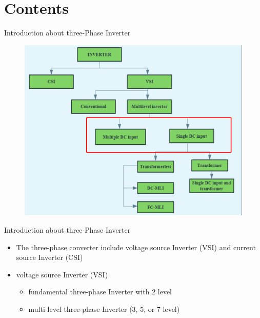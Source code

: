\documentclass[
	11pt, %
]{beamer}
\begin{document}

\section{Contents}
\begin{frame}{Introduction about three-Phase Inverter}
	\begin{figure}
		\includegraphics[width=0.7\linewidth]{introthreephaseinverter.png}
	\end{figure}
\end{frame}

\begin{frame}{Introduction about three-Phase Inverter}
	\begin{itemize}
		\setlength{\itemsep}{10pt}
		\item {The three-phase converter include voltage source Inverter (VSI) and current source Inverter (CSI)}
		\item {voltage source Inverter (VSI)}
		\begin{itemize}
			\setlength{\itemsep}{10pt}
			\item {fundamental three-phase Inverter with 2 level}
			\item {multi-level three-phase Inverter (3, 5, or 7 level)}
		\end{itemize}
	\end{itemize}
\end{frame}
\end{document}

